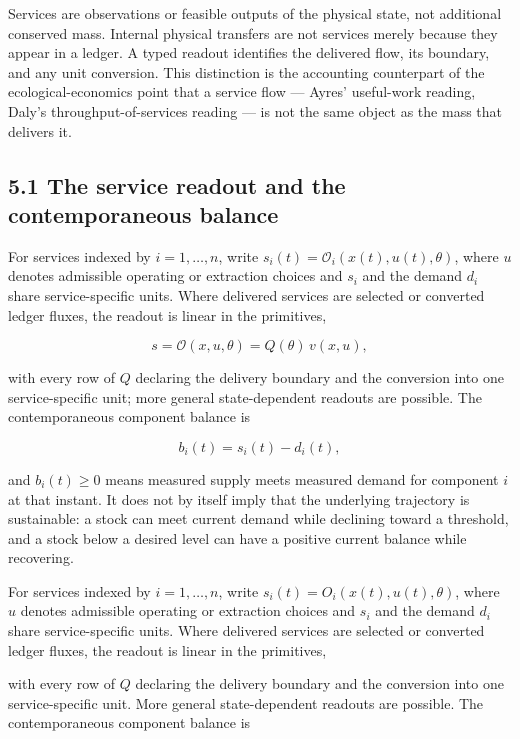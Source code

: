 \documentclass[11pt]{article}
\begin{document}
Services are observations or feasible outputs of the physical state, not additional conserved mass. Internal physical transfers are not services merely because they appear in a ledger. A typed readout identifies the delivered flow, its boundary, and any unit conversion. This distinction is the accounting counterpart of the ecological-economics point that a service flow --- Ayres' useful-work reading, Daly's throughput-of-services reading --- is not the same object as the mass that delivers it.

\subsection*{5.1 The service readout and the contemporaneous balance}\label{51-the-service-readout-and-the-contemporaneous-balance}

For services indexed by \(i = 1, \ldots, n\), write \(s_i(t) =\allowbreak{} \mathcal{O}_i(x(t),\allowbreak{} u(t),\allowbreak{} \theta)\), where \(u\) denotes admissible operating or extraction choices and \(s_i\) and the demand \(d_i\) share service-specific units. Where delivered services are selected or converted ledger fluxes, the readout is linear in the primitives, 

$$s = \mathcal{O}(x, u, \theta) = Q(\theta)\, v(x, u),$$

 with every row of \(Q\) declaring the delivery boundary and the conversion into one service-specific unit; more general state-dependent readouts are possible. The contemporaneous component balance is 

$$b_i(t) = s_i(t) - d_i(t),$$

 and \(b_i(t) \ge 0\) means measured supply meets measured demand for component \(i\) at that instant. It does not by itself imply that the underlying trajectory is sustainable: a stock can meet current demand while declining toward a threshold, and a stock below a desired level can have a positive current balance while recovering.

For services indexed by \(i=1,\dots,n\), write \(s_i(t)=O_i(x(t),u(t),\theta)\), where \(u\) denotes admissible operating or extraction choices and \(s_i\) and the demand \(d_i\) share service-specific units. Where delivered services are selected or converted ledger fluxes, the readout is linear in the primitives,

with every row of \(Q\) declaring the delivery boundary and the conversion into one service-specific unit. More general state-dependent readouts are possible. The contemporaneous component balance is
\end{document}

